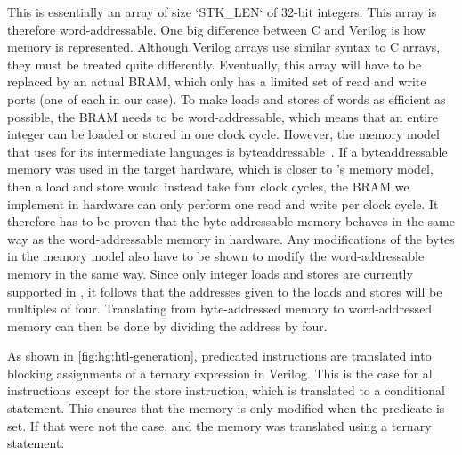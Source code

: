 This is essentially an array of size \veriloginline`STK_LEN` of 32-bit integers.
This array is therefore word-addressable.  One big difference between C and
Verilog is how memory is represented.  Although Verilog arrays use similar
syntax to C arrays, they must be treated quite differently.  Eventually, this
array will have to be replaced by an actual \gls{BRAM}, which only has a limited set of
read and write ports (one of each in our case).  To make loads and stores of
words as efficient as possible, the \gls{BRAM} needs to be word-addressable, which
means that an entire integer can be loaded or stored in one clock cycle.
However, the memory model that \compcert{} uses for its intermediate languages
is byte\?addressable~\cite{blazy05_formal_verif_memor_model_c}.  If a
byte\?addressable memory was used in the target hardware, which is closer to
\compcert{}'s memory model, then a load and store would instead take four clock
cycles, the \gls{BRAM} we implement in hardware can only perform one read and write per
clock cycle.  It therefore has to be proven that the byte-addressable memory
behaves in the same way as the word-addressable memory in hardware.  Any
modifications of the bytes in the \compcert{} memory model also have to be shown
to modify the word-addressable memory in the same way.  Since only integer loads
and stores are currently supported in \vericert{}, it follows that the addresses
given to the loads and stores will be multiples of four.  Translating from
byte-addressed memory to word-addressed memory can then be done by dividing the
address by four.

As shown in \cref{fig:hg:htl-generation}, predicated instructions are translated
into blocking assignments of a ternary expression in Verilog.  This is the case
for all instructions except for the store instruction, which is translated to a
conditional statement.  This ensures that the memory is only modified when the
predicate is set.  If that were not the case, and the memory was translated
using a ternary statement:

\begin{center}
\end{center}

